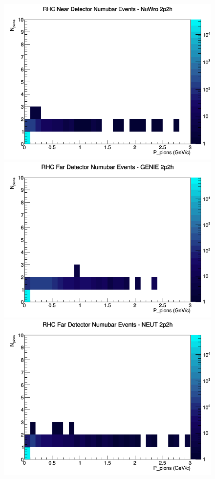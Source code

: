 \documentclass[12pt]{article}
\begin{document}
\begin{figure}[h]
\includegraphics[width=\linewidth]{N_P/nominal/pions/2p2h_RHC_ND_numubar_N_P_NuWro.png}
\endminipage
\newline
{}
\includegraphics[width=\linewidth]{N_P/nominal/pions/2p2h_RHC_FD_numubar_N_P_GENIE.png}
\endminipage
{}
\includegraphics[width=\linewidth]{N_P/nominal/pions/2p2h_RHC_FD_numubar_N_P_NEUT.png}

\end{figure}
\end{document}
